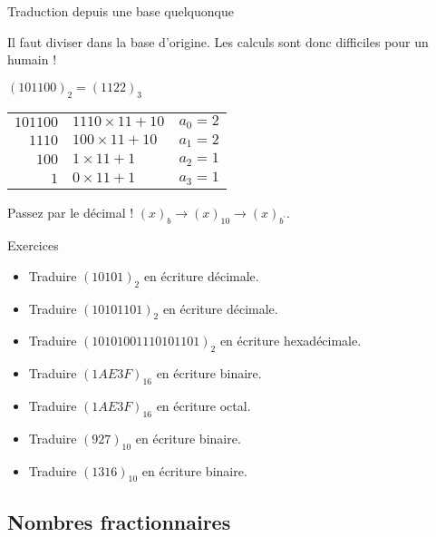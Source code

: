 
\begin{frame}{Traduction depuis une base quelquonque}

  \begin{block}{Il faut diviser dans la base d'origine.}
    Les calculs sont donc difficiles pour un humain !
  \end{block}

    \begin{exampleblock}{$(101100)_2 = (1122)_3$}
      \begin{tabular}{r@{ = }ll}
         $101100$ & $1110 \times 11 + 10$ & $ a_0 = 2$ \\
         $1110$ & $100 \times 11 + 10$ & $a_1 = 2$ \\
         $100$ & $1\times 11 + 1$ & $a_2 = 1$ \\
         $1$ & $0\times 11 + 1$ & $a_3 = 1$ \\
      \end{tabular}
    \end{exampleblock}

    \begin{alertblock}{Passez par le décimal !}
      $ (x)_b \rightarrow (x)_{10} \rightarrow (x)_{b^{\prime}}$.
    \end{alertblock}


\end{frame}


  \begin{frame}{Exercices}
   \begin{itemize}
   \item Traduire $(10101)_2$ en écriture décimale.
   \item Traduire $(10101101)_2$ en écriture décimale.
   \item Traduire $(10101001110101101)_2$ en écriture hexadécimale.
   \item Traduire $(1AE3F)_{16}$ en écriture binaire.
   \item Traduire $(1AE3F)_{16}$ en écriture octal.
   \item Traduire $(927)_{10}$ en écriture binaire.
   \item Traduire $(1316)_{10}$ en écriture binaire.
  \end{itemize}
\end{frame}


\subsection{Nombres fractionnaires}

